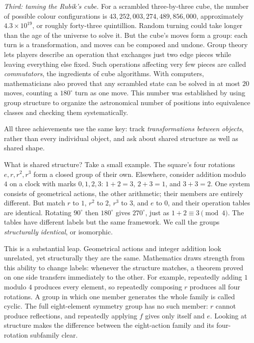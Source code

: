 \emph{Third: taming the Rubik's cube.} For a scrambled three-by-three cube, the number of possible colour configurations is $43{,}252{,}003{,}274{,}489{,}856{,}000$, approximately $4.3\times10^{19}$, or roughly forty-three quintillion. Random turning could take longer than the age of the universe to solve it. But the cube's moves form a group: each turn is a transformation, and moves can be composed and undone. Group theory lets players describe an operation that exchanges just two edge pieces while leaving everything else fixed. Such operations affecting very few pieces are called \emph{commutators}, the ingredients of cube algorithms. With computers, mathematicians also proved that any scrambled state can be solved in at most $20$ moves, counting a $180^\circ$ turn as one move. This number was established by using group structure to organize the astronomical number of positions into equivalence classes and checking them systematically.

All three achievements use the same key: track \emph{transformations between objects}, rather than every individual object, and ask about shared structure as well as shared shape.

What is shared structure? Take a small example. The square's four rotations $e,r,r^2,r^3$ form a closed group of their own. Elsewhere, consider addition modulo $4$ on a clock with marks $0,1,2,3$: $1+2=3$, $2+3=1$, and $3+3=2$. One system consists of geometrical actions, the other arithmetic; their members are entirely different. But match $r$ to $1$, $r^2$ to $2$, $r^3$ to $3$, and $e$ to $0$, and their operation tables are identical. Rotating $90^\circ$ then $180^\circ$ gives $270^\circ$, just as $1+2\equiv3\pmod 4$. The tables have different labels but the same framework. We call the groups \emph{structurally identical}, or isomorphic.

This is a substantial leap. Geometrical actions and integer addition look unrelated, yet structurally they are the same. Mathematics draws strength from this ability to change labels: whenever the structure matches, a theorem proved on one side transfers immediately to the other. For example, repeatedly adding $1$ modulo $4$ produces every element, so repeatedly composing $r$ produces all four rotations. A group in which one member generates the whole family is called cyclic. The full eight-element symmetry group has no such member: $r$ cannot produce reflections, and repeatedly applying $f$ gives only itself and $e$. Looking at structure makes the difference between the eight-action family and its four-rotation subfamily clear.

